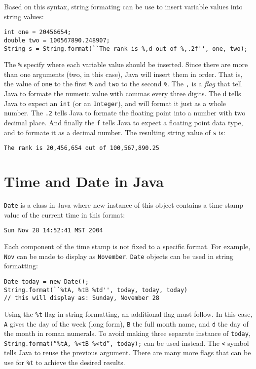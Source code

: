 \documentclass{tufte-handout}
\begin{document}
    Based on this syntax, string formating can be use to insert variable values into string values:

    \begin{lstlisting}
int one = 20456654;
double two = 100567890.248907;
String s = String.format(``The rank is %,d out of %,.2f'', one, two);
    \end{lstlisting}

    The \texttt{\%} specify where each variable value should be inserted. Since there are more than one arguments (two, in this case), Java will insert them in order. That is, the value of \texttt{one} to the first \texttt{\%} and \texttt{two} to the second \texttt{\%}. The \texttt{,} is a \emph{flag} that tell Java to formate the numeric value with commas every three digits. The \texttt{d} tells Java to expect an \texttt{int} (or an \texttt{Integer}), and will format it just as a whole number. The \texttt{.2} tells Java to formate the floating point into a number with two decimal place. And finally the \texttt{f} tells Java to expect a floating point data type, and to formate it as a decimal number. The resulting string value of \texttt{s} is:

    \begin{lstlisting}
The rank is 20,456,654 out of 100,567,890.25
    \end{lstlisting}

    \section*{Time and Date in Java}
    \texttt{Date} is a class in Java where new instance of this object contains a time stamp value of the current time in this format:

    \begin{lstlisting}
Sun Nov 28 14:52:41 MST 2004
    \end{lstlisting}

    Each component of the time stamp is not fixed to a specific format. For example, \texttt{Nov} can be made to display as \texttt{November}. \texttt{Date} objects can be used in string formatting:

    \begin{lstlisting}
Date today = new Date();
String.format(``%tA, %tB %td'', today, today, today)
// this will display as: Sunday, November 28
     \end{lstlisting} 

    Using the \texttt{\%t} flag in string formatting, an additional flag must follow. In this case, \texttt{A} gives the day of the week (long form), \texttt{B} the full month name, and \texttt{d} the day of the month in roman numerals. To avoid making three separate instance of \texttt{today}, \texttt{String.format(``\%tA, \%<tB \%<td'', today);} can be used instead. The \texttt{<} symbol tells Java to reuse the previous argument. There are many more flags that can be use for \texttt{\%t} to achieve the desired results.
\end{document}
